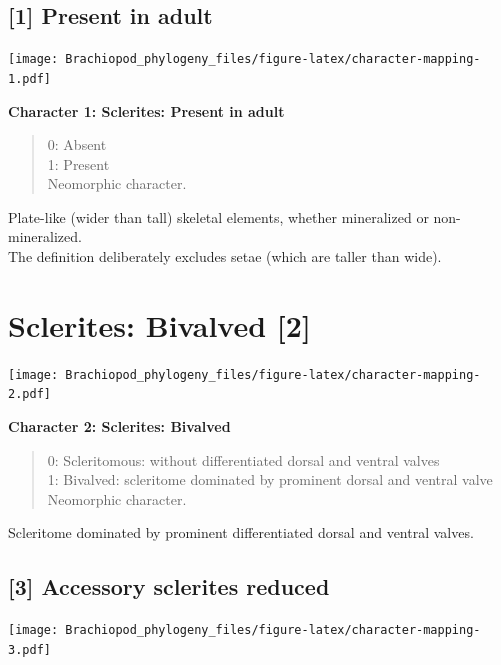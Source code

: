 \documentclass[]{book}
\theoremstyle{definition}
\theoremstyle{definition}
\theoremstyle{definition}
\theoremstyle{remark}
\begin{document}
\hypertarget{present-in-adult}{%
\subsection*{{[}1{]} Present in adult}\label{present-in-adult}}

\texttt{[image: Brachiopod\_phylogeny\_files/figure-latex/character-mapping-1.pdf]}

\textbf{Character 1: Sclerites: Present in adult}

\begin{quote}
0: Absent\\
1: Present\\
Neomorphic character.
\end{quote}

Plate-like (wider than tall) skeletal elements, whether mineralized or
non-mineralized.\\
The definition deliberately excludes setae (which are taller than wide).

\hypertarget{sclerites-bivalved-2}{%
\section{Sclerites: Bivalved {[}2{]}}\label{sclerites-bivalved-2}}

\texttt{[image: Brachiopod\_phylogeny\_files/figure-latex/character-mapping-2.pdf]}

\textbf{Character 2: Sclerites: Bivalved}

\begin{quote}
0: Scleritomous: without differentiated dorsal and ventral valves\\
1: Bivalved: scleritome dominated by prominent dorsal and ventral
valve\\
Neomorphic character.
\end{quote}

Scleritome dominated by prominent differentiated dorsal and ventral
valves.

\hypertarget{accessory-sclerites-reduced}{%
\subsection*{{[}3{]} Accessory sclerites
reduced}\label{accessory-sclerites-reduced}}

\texttt{[image: Brachiopod\_phylogeny\_files/figure-latex/character-mapping-3.pdf]}
\end{document}
